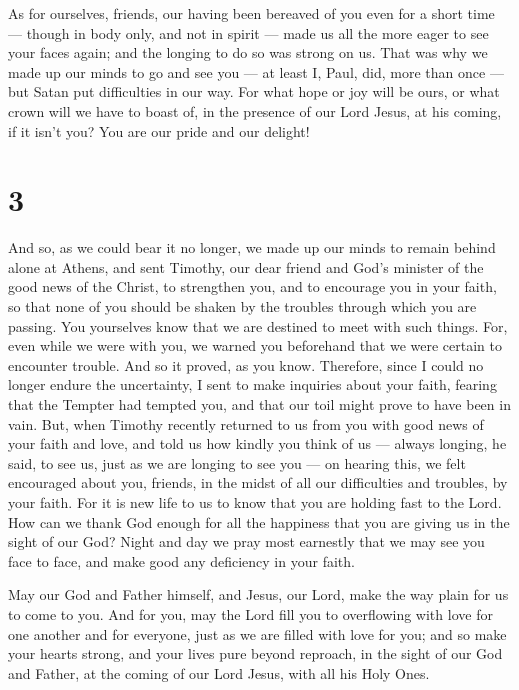  As for ourselves, friends, our having been bereaved of you
even for a short time --- though in body only, and not in spirit ---
made us all the more eager to see your faces again; and the longing to
do so was strong on us.  That was why we made up our minds
to go and see you --- at least I, Paul, did, more than once --- but
Satan put difficulties in our way.  For what hope or joy
will be ours, or what crown will we have to boast of, in the presence of
our Lord Jesus, at his coming, if it isn't you?  You are
our pride and our delight!

\hypertarget{section-2}{%
\section{3}\label{section-2}}

 And so, as we could bear it no longer, we made up our minds
to remain behind alone at Athens,  and sent Timothy, our
dear friend and God's minister of the good news of the Christ, to
strengthen you, and to encourage you in your faith,  so that
none of you should be shaken by the troubles through which you are
passing. You yourselves know that we are destined to meet with such
things.  For, even while we were with you, we warned you
beforehand that we were certain to encounter trouble. And so it proved,
as you know.  Therefore, since I could no longer endure the
uncertainty, I sent to make inquiries about your faith, fearing that the
Tempter had tempted you, and that our toil might prove to have been in
vain.  But, when Timothy recently returned to us from you
with good news of your faith and love, and told us how kindly you think
of us --- always longing, he said, to see us, just as we are longing to
see you ---  on hearing this, we felt encouraged about you,
friends, in the midst of all our difficulties and troubles, by your
faith.  For it is new life to us to know that you are
holding fast to the Lord.  How can we thank God enough for
all the happiness that you are giving us in the sight of our God?
 Night and day we pray most earnestly that we may see you
face to face, and make good any deficiency in your faith.

 May our God and Father himself, and Jesus, our Lord, make
the way plain for us to come to you.  And for you, may the
Lord fill you to overflowing with love for one another and for everyone,
just as we are filled with love for you;  and so make your
hearts strong, and your lives pure beyond reproach, in the sight of our
God and Father, at the coming of our Lord Jesus, with all his Holy Ones.


